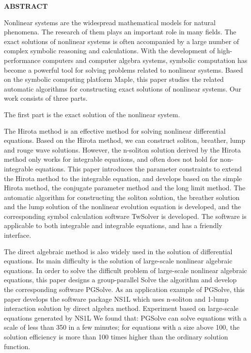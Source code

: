 {}
\centerline{\bfseries ABSTRACT}

\linespread{1.4}
\bigskip

Nonlinear systems are the widespread mathematical models for natural phenomena. The research of them plays an important role in many fields. The exact solutions of nonlinear systems is often accompanied by a large number of complex symbolic reasoning and calculations. With the development of high-performance computers and computer algebra systems, symbolic computation has become a powerful tool for solving problems related to nonlinear systems. Based on the symbolic computing platform Maple, this paper studies the related automatic algorithms for constructing exact solutions of nonlinear systems. Our work consists of three parts.

The first part is the exact solution of the nonlinear system.

The Hirota method is an effective method for solving nonlinear differential equations. Based on the Hirota method, we can construct soliton, breather, lump and rouge wave solutions. However, the n-soliton solution derived by the Hirota method  only works for integrable equations, and often does not hold for non-integrable equations. This paper introduces the parameter constraints to extend the Hirota method to the integrable equation, and develops based on the simple Hirota method, the conjugate parameter method and the long limit method. The automatic algorithm for constructing the soliton solution, the breather solution and the lump solution of the nonlinear evolution equation is developed, and the corresponding symbol calculation software TwSolver is developed. The software is applicable to both integrable and integrable equations, and has a friendly interface.

The direct algebraic method is also widely used in the solution of differential equations. Its main difficulty is the solution of large-scale nonlinear algebraic equations. In order to solve the difficult problem of large-scale nonlinear algebraic equations, this paper designs a group-parallel Solve the algorithm and develop the corresponding software PGSolve. As an application example of PGSolve, this paper develops the software package NS1L which uses n-soliton and 1-lump interaction solution by direct algebra method. Experiment based on large-scale equations generated by NS1L We found that: PGSolve can solve equations with a scale of less than 350 in a few minutes; for equations with a size above 100, the solution efficiency is more than 100 times higher than the ordinary solution function.

